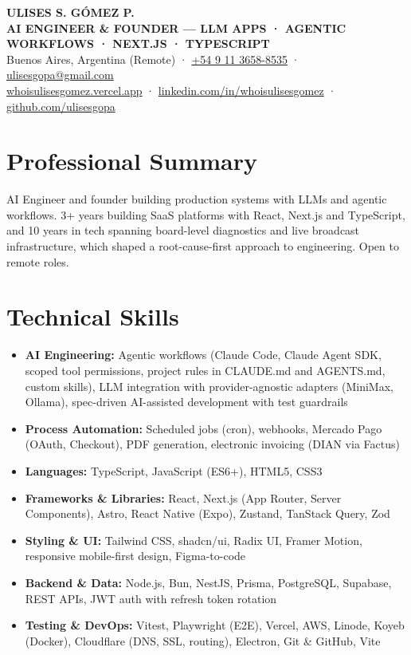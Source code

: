 \documentclass[10pt,letterpaper]{article}
\begin{document}
\begin{center}
  {\fontsize{20}{24}\selectfont\bfseries\color{navy} ULISES S. GÓMEZ P.}\\[0.4em]
  {\sffamily\bfseries\small\color{navy!80!accent}AI ENGINEER \& FOUNDER — LLM APPS · AGENTIC WORKFLOWS · NEXT.JS · TYPESCRIPT}\\[0.45em]
  {\small\color{muted}
    Buenos Aires, Argentina (Remote) · \href{tel:+5491136588535}{+54 9 11 3658-8535} · \href{mailto:ulisesgopa@gmail.com}{ulisesgopa@gmail.com}\\
    \href{https://whoisulisesgomez.vercel.app}{whoisulisesgomez.vercel.app} · \href{https://linkedin.com/in/whoisulisesgomez}{linkedin.com/in/whoisulisesgomez} · \href{https://github.com/ulisesgopa}{github.com/ulisesgopa}}
\end{center}

\section{Professional Summary}
\hspace{1.5em}AI Engineer and founder building production systems with LLMs and agentic workflows. 3+ years building SaaS platforms with React, Next.js and TypeScript, and 10 years in tech spanning board-level diagnostics and live broadcast infrastructure, which shaped a root-cause-first approach to engineering. Open to remote roles.

\section{Technical Skills}
\begin{itemize}
  \item \textbf{AI Engineering:} Agentic workflows (Claude Code, Claude Agent SDK, scoped tool permissions, project rules in CLAUDE.md and AGENTS.md, custom skills), LLM integration with provider-agnostic adapters (MiniMax, Ollama), spec-driven AI-assisted development with test guardrails
  \item \textbf{Process Automation:} Scheduled jobs (cron), webhooks, Mercado Pago (OAuth, Checkout), PDF generation, electronic invoicing (DIAN via Factus)
  \item \textbf{Languages:} TypeScript, JavaScript (ES6+), HTML5, CSS3
  \item \textbf{Frameworks \& Libraries:} React, Next.js (App Router, Server Components), Astro, React Native (Expo), Zustand, TanStack Query, Zod
  \item \textbf{Styling \& UI:} Tailwind CSS, shadcn/ui, Radix UI, Framer Motion, responsive mobile-first design, Figma-to-code
  \item \textbf{Backend \& Data:} Node.js, Bun, NestJS, Prisma, PostgreSQL, Supabase, REST APIs, JWT auth with refresh token rotation
  \item \textbf{Testing \& DevOps:} Vitest, Playwright (E2E), Vercel, AWS, Linode, Koyeb (Docker), Cloudflare (DNS, SSL, routing), Electron, Git \& GitHub, Vite
\end{itemize}
\end{document}
